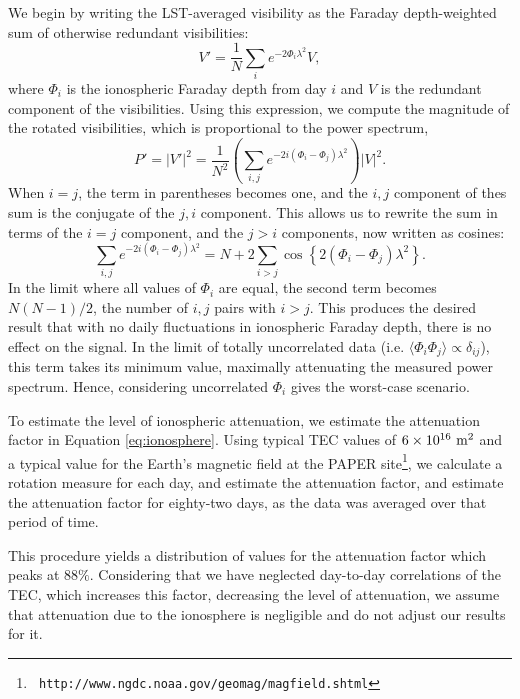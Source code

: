 We begin by writing the LST-averaged visibility as the Faraday depth-weighted sum of otherwise
redundant visibilities:
\begin{equation}
  V' = \frac{1}{N}\sum_i e^{-2\Phi_i\lambda^2}V,
\end{equation}
where $\Phi_i$ is the ionospheric Faraday depth from day $i$ and $V$ is the redundant component of
the visibilities. Using this expression, we compute the magnitude of the rotated visibilities, which 
is proportional to the power spectrum,
\begin{equation}
  P' = |V'|^2 = \frac{1}{N^2}\left(\sum_{i,j}e^{-2i(\Phi_i-\Phi_j)\lambda^2}\right)|V|^2.
\end{equation}
When $i=j$, the term in parentheses becomes one, and the $i,j$ component of thes sum is the
conjugate of the $j,i$ component. This allows us to rewrite the sum in terms of the $i=j$ component,
and the $j>i$ components, now written as cosines:
\begin{equation}
  \sum_{i,j} e^{-2i(\Phi_i-\Phi_j)\lambda^2} 
    = N+2
    \sum_{i>j}\cos\left\{2(\Phi_i-\Phi_j)\lambda^2\right\}.
  \label{eq:ionosphere}  
\end{equation}
In the limit where all values of $\Phi_i$ are equal, the second term becomes $N(N-1)/2$, the number
of $i,j$ pairs with $i>j$. This produces the desired result that with no daily fluctuations in
ionospheric Faraday depth, there is no effect on the signal. In the limit of totally uncorrelated
data (i.e. $\langle\Phi_i\Phi_j\rangle\propto\delta_{ij}$), this term takes its minimum value,
maximally attenuating the measured power spectrum. Hence, considering uncorrelated $\Phi_i$ gives
the worst-case scenario.

To estimate the level of ionospheric attenuation, we estimate the attenuation factor in Equation
\ref{eq:ionosphere}. Using typical TEC values of $6\times10^{16}\ {\rm m}^2$ and a typical value 
for the Earth's magnetic field at the PAPER site\footnote{{\tt
http://www.ngdc.noaa.gov/geomag/magfield.shtml}}, we calculate a rotation measure for each day, and
estimate the attenuation factor, and estimate the attenuation factor for eighty-two days, as the data
was averaged over that period of time.

This procedure yields a distribution of values for the attenuation factor which peaks at $88\%$.
Considering that we have neglected day-to-day correlations of the TEC, which increases this factor,
decreasing the level of attenuation, we assume that attenuation due to the ionosphere is negligible
and do not adjust our results for it.
